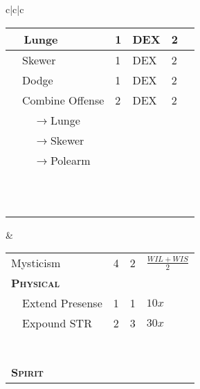 \documentclass{article}
\begin{document}
\begin{tabular}{c|c|c}
\begin{tabular}{p{1.2in}|p{.15in}|p{.15in}|p{.15in}|p{.15in}}
    \hline
    ~~Lunge & 1 & \tiny{DEX} & 2 & \\
    \hline
    ~~Skewer & 1 & \tiny{DEX} & 2 & \\
    \hline
    ~~Dodge & 1 & \tiny{DEX} & 2 & \\
    \hline
    ~~Combine Offense & 2 & \tiny{DEX} & 2 & \\
    \hline
    ~~~~$\rightarrow$Lunge & & & & \\
    \hline
    ~~~~$\rightarrow$Skewer & & & & \\
    \hline
    ~~~~$\rightarrow$Polearm & & & & \\
    \hline
    & & & & \\
    \hline
    & & & & \\
    \hline
    & & & & \\
    \hline
    & & & & \\
    \hline
    & & & & \\
    \hline
    & & & & \\
    \hline
    & & & & \\
    \hline
    & & & & \\
    \hline
    & & & & \\
    \hline
    & & & & \\
    \hline
    & & & & \\
  \end{tabular} &
    \begin{tabular}{p{1.4in}|p{.2in}|p{.2in}|p{.2in}}
    \textsmscbf{Name} & \texttyscbf{Rank}
    & \texttyscbf{Time} & \texttyscbf{MP} \\
    \hline
    \hline
    Mysticism & 4 & 2 & \tiny{$\frac{WIL+WIS}{2}$} \\
    \hline
    \hline
    \hline
    \textsc{\textbf{Physical}} & & & \\
    \hline
    ~~Extend Presense & 1 & 1 & $10x$ \\
    \hline
    ~~Expound STR & 2 & 3 & $30x$ \\
    \hline
    & & & \\
    \hline
    & & & \\
    \hline
    & & & \\
    \hline
    & & & \\
    \hline
    & & & \\
    \hline
    & & & \\
    \hline
    & & & \\
    \hline
    \hline
    \hline
    \textsc{\textbf{Spirit}} & & & \\

\end{tabular}
\end{tabular}
\end{document}

